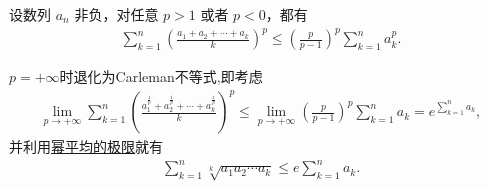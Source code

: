 \documentclass[../../main.tex]{subfiles}%
\begin{document}
\begin{corollary}[离散的Hardy不等式]\label{corollary:离散版Hardy(哈代)不等式}
设数列 $a_n$ 非负，对任意 $p > 1$ 或者 $p < 0$，都有
\begin{align*}
\sum_{k=1}^n \left( \frac{a_1 + a_2 + \cdots + a_k}{k} \right)^p \leqslant \left( \frac{p}{p - 1} \right)^p \sum_{k=1}^n a_k^p.
\end{align*}
\end{corollary}
\begin{remark}
$p=+\infty$时退化为Carleman不等式,即考虑
\begin{align*}
\lim\limits_{p\to+\infty}\sum\limits_{k=1}^n\left( \frac{a_1^{\frac{1}{p}}+a_2^{\frac{1}{p}}+\cdots+a_k^{\frac{1}{p}}}{k} \right)^p \leqslant \lim\limits_{p\to+\infty}\left( \frac{p}{p-1} \right)^p\sum\limits_{k=1}^n a_k = e^{\sum\limits_{k=1}^n a_k},
\end{align*}
并利用\hyperref[proposition:幂平均的极限]{幂平均的极限}就有
\begin{align*}
\sum\limits_{k=1}^n \sqrt[k]{a_1a_2\cdots a_k} \leqslant e\sum\limits_{k=1}^n a_k.
\end{align*}
\end{remark}
\end{document}
